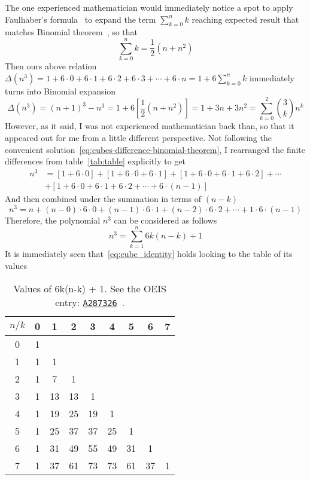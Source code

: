 The one experienced mathematician would immediately notice a spot to apply Faulhaber's formula~\cite{beardon1996sums}
to expand the term $\sum_{k=0}^{n} k$ reaching expected result that matches Binomial theorem~\cite{abramowitz1988handbook},
so that
\begin{equation*}
    \sum_{k=0}^{n} k = \frac{1}{2}(n+n^2)
\end{equation*}
Then ours above relation $\Delta(n^3) = 1+6\cdot0+6\cdot1+6\cdot2+6\cdot3+\cdots+6\cdot n = 1 + 6 \sum_{k=0}^{n} k$
immediately turns into Binomial expansion
\begin{equation}
    \Delta(n^3) = (n+1)^3 - n^3 = 1 + 6 \left[ \frac{1}{2}(n+n^2) \right] = 1 + 3 n + 3 n^2 = \sum_{k=0}^{2} \binom{3}{k} n^k
    \label{eq:cubes-difference-binomial-theorem}
\end{equation}
However, as it said, I was not experienced mathematician back than,
so that it appeared out for me from a little different perspective.
Not following the convenient solution~\eqref{eq:cubes-difference-binomial-theorem},
I rearranged the finite differences from table~\eqref{tab:table} explicitly to get
\begin{align*}
    n^3 &= [1+6\cdot0]+[1+6\cdot0+6\cdot1]+[1+6\cdot0+6\cdot1+6\cdot2]+\cdots \\
    &+[1+6\cdot0+6\cdot1+6\cdot2+\cdots+6\cdot(n-1)]
\end{align*}
And then combined under the summation in terms of $(n-k)$
\[
    n^3 = n +(n-0) \cdot6 \cdot0 + (n-1)\cdot6\cdot1 + (n-2)\cdot6\cdot2 + \cdots+1\cdot6\cdot(n-1)
\]
Therefore, the polynomial $n^3$ can be considered as follows
\begin{equation}
    \label{eq:cube_identity}
    n^3 = \sum_{k=1}^{n} 6k(n-k) + 1
\end{equation}
It is immediately seen that~\eqref{eq:cube_identity} holds looking to the table of its values
\begin{table}[H]
    \setlength\extrarowheight{-5pt}
    \begin{tabular}{c|cccccccc}
        $n/k$ & 0 & 1  & 2  & 3  & 4  & 5  & 6  & 7 \\
        \hline
        0     & 1 &    &    &    &    &    &    &   \\
        1     & 1 & 1  &    &    &    &    &    &   \\
        2     & 1 & 7  & 1  &    &    &    &    &   \\
        3     & 1 & 13 & 13 & 1  &    &    &    &   \\
        4     & 1 & 19 & 25 & 19 & 1  &    &    &   \\
        5     & 1 & 25 & 37 & 37 & 25 & 1  &    &   \\
        6     & 1 & 31 & 49 & 55 & 49 & 31 & 1  &   \\
        7     & 1 & 37 & 61 & 73 & 73 & 61 & 37 & 1
    \end{tabular}
    \caption{Values of 6k(n-k) + 1. See the OEIS entry: \href{https://oeis.org/A287326}{\texttt{A287326}}~\cite{kolosov2017third}.}
    \label{tab:fig_1}
\end{table}
